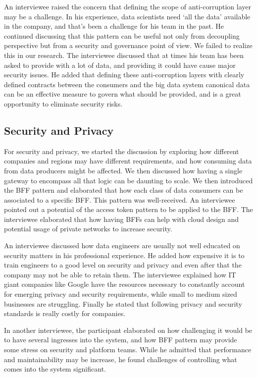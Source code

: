 \documentclass{bmcart}
\begin{document}
An interviewee raised the concern that defining the scope of anti-corruption layer may be a challenge. In his experience, data scientists need `all the data' available in the company, and that's been a challenge for his team in the past. He continued discussing that this pattern can be useful not only from decoupling perspective but from a security and governance point of view. We failed to realize this in our research. The interviewee discussed that at times his team has been asked to provide with a lot of data, and providing it could have cause major security issues. He added that defining these anti-corruption layers with clearly defined contracts between the consumers and the big data system canonical data can be an effective measure to govern what should be provided, and is a great opportunity to eliminate security risks. 


\subsection{Security and Privacy}

For security and privacy, we started the discussion by exploring how different companies and regions may have different requirements, and how consuming data from data producers might be affected. We then discussed how having a single gateway to encompass all that logic can be daunting to scale. We then introduced the BFF pattern and elaborated that how each class of data consumers can be associated to a specific BFF. This pattern was well-received. An interviewee pointed out a potential of the access token pattern to be applied to the BFF. The interviewee elaborated that how having BFFs can help with cloud design and potential usage of private networks to increase security. 

An interviewee discussed how data engineers are usually not well educated on security matters in his professional experience. He added how expensive it is to train engineers to a good level on security and privacy and even after that the company may not be able to retain them. The interviewee explained how IT giant companies like Google have the resources necessary to constantly account for emerging privacy and security requirements, while small to medium sized businesses are struggling. Finally he stated that following privacy and security standards is really costly for companies.

In another interviewee, the participant elaborated on how challenging it would be to have several ingresses into the system, and how BFF pattern may provide some stress on security and platform teams. While he admitted that performance and maintainability may be increase, he found challenges of controlling what comes into the system significant. 
\end{document}
